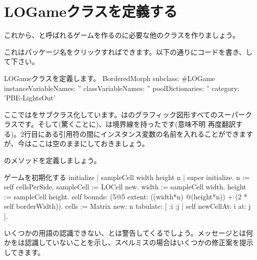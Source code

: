 \documentclass[a4paper,10pt,twoside]{book}
\begin{document}

\section{LOGameクラスを定義する}

これから、と呼ばれるゲームを作るのに必要な他のクラスを作りましょう。

これはパッケージ名をクリックすればできます。以下の通りにコードを書き、して下さい。

\begin{classdef}[sbegame]{LOGameクラスを定義します。}
BorderedMorph subclass: #LOGame
   instanceVariableNames: ''
   classVariableNames: ''
   poolDictionaries: ''
   category: 'PBE-LightsOut'
\end{classdef}

ここではをサブクラス化しています。は\pharo のグラフィック図形すべてのスーパークラスです。そして(驚くことに)、は境界線を持ったです(意味不明 再度翻訳する)。2行目にある引用符の間にインスタンス変数の名前を入れることができますが、今はここは空のままにしておきましょう。

のメソッドを定義しましょう。


\begin{numMethod}[sbegameinitialize]{ゲームを初期化する}
initialize
   | sampleCell width height n |
   super initialize.
   n := self cellsPerSide.
   sampleCell := LOCell new.
   width := sampleCell width.
   height := sampleCell height.
   self bounds: (5@5 extent: ((width*n) @(height*n)) + (2 * self borderWidth)).
   cells := Matrix new: n tabulate: [ :i :j | self newCellAt: i at: j ].
\end{numMethod}


いくつかの用語の認識できない、と\pharo は警告してくるでしょう。メッセージとは何かを\pharo は認識していないことを示し、スペルミスの場合はいくつかの修正案を提示してきます。
\end{document}
